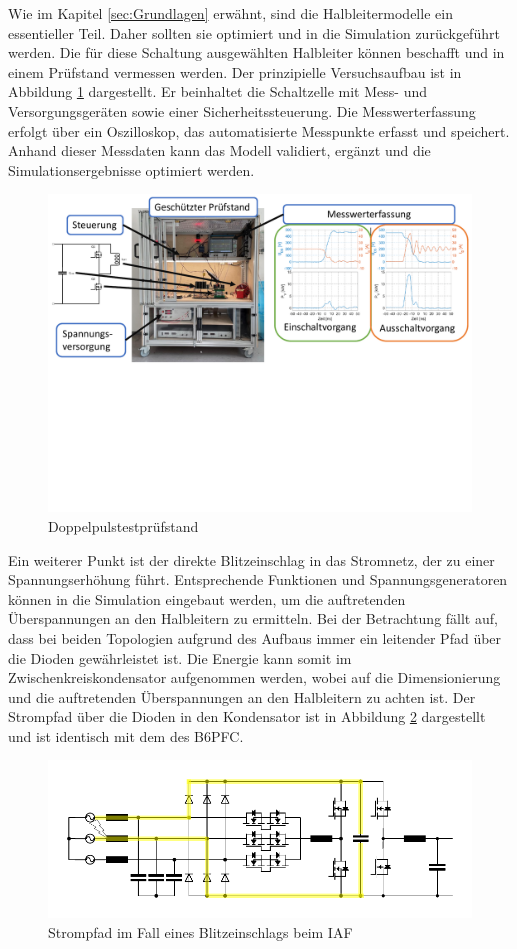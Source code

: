Wie im Kapitel \ref{sec:Grundlagen} erwähnt, sind die Halbleitermodelle ein essentieller Teil. Daher sollten sie optimiert und in die Simulation zurückgeführt werden. Die für diese Schaltung ausgewählten Halbleiter können beschafft und in einem Prüfstand vermessen werden. Der prinzipielle Versuchsaufbau ist in Abbildung \ref{fig:dpt} dargestellt. Er beinhaltet die Schaltzelle mit Mess- und Versorgungsgeräten sowie einer Sicherheitssteuerung. Die Messwerterfassung erfolgt über ein Oszilloskop, das automatisierte Messpunkte erfasst und speichert.  Anhand dieser Messdaten kann das Modell validiert, ergänzt und die Simulationsergebnisse optimiert werden.
\begin{figure} [H]
	\centering
	\includegraphics[width=0.95\linewidth]{content/Grafiken/DPT}
	\caption{Doppelpulstestprüfstand}
	\label{fig:dpt}
\end{figure}
Ein weiterer Punkt ist der direkte Blitzeinschlag in das Stromnetz, der zu einer Spannungserhöhung führt. Entsprechende Funktionen und Spannungsgeneratoren können in die Simulation eingebaut werden, um die auftretenden Überspannungen an den Halbleitern zu ermitteln. Bei der Betrachtung fällt auf, dass bei beiden Topologien aufgrund des Aufbaus immer ein leitender Pfad über die Dioden gewährleistet ist. Die Energie kann somit im Zwischenkreiskondensator aufgenommen werden, wobei auf die Dimensionierung und die auftretenden Überspannungen an den Halbleitern zu achten ist. Der Strompfad über die Dioden in den Kondensator ist in Abbildung \ref{fig:iafsurge} dargestellt und ist identisch mit dem des \gls{B6PFC}.
\begin{figure}[H]
	\centering
	\includegraphics[width=0.95\linewidth]{content/Grafiken/IAF_surge}
	\caption{Strompfad im Fall eines Blitzeinschlags beim IAF}
	\label{fig:iafsurge}
\end{figure}
